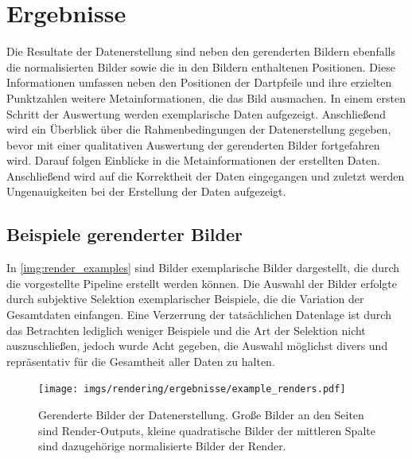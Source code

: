 
\section{Ergebnisse}
\label{sec:daten:ergebnisse}

Die Resultate der Datenerstellung sind neben den gerenderten Bildern ebenfalls die normalisierten Bilder sowie die in den Bildern enthaltenen Positionen. Diese Informationen umfassen neben den Positionen der Dartpfeile und ihre erzielten Punktzahlen weitere Metainformationen, die das Bild ausmachen. In einem ersten Schritt der Auswertung werden exemplarische Daten aufgezeigt. Anschließend wird ein Überblick über die Rahmenbedingungen der Datenerstellung gegeben, bevor mit einer qualitativen Auswertung der gerenderten Bilder fortgefahren wird. Darauf folgen Einblicke in die Metainformationen der erstellten Daten. Anschließend wird auf die Korrektheit der Daten eingegangen und zuletzt werden Ungenauigkeiten bei der Erstellung der Daten aufgezeigt.


\subsection{Beispiele gerenderter Bilder}  %
\label{sec:render_beispiel}

In \autoref{img:render_examples} sind Bilder exemplarische Bilder dargestellt, die durch die vorgestellte Pipeline erstellt werden können. Die Auswahl der Bilder erfolgte durch subjektive Selektion exemplarischer Beispiele, die die Variation der Gesamtdaten einfangen. Eine Verzerrung der tatsächlichen Datenlage ist durch das Betrachten lediglich weniger Beispiele und die Art der Selektion nicht auszuschließen, jedoch wurde Acht gegeben, die Auswahl möglichst divers und repräsentativ für die Gesamtheit aller Daten zu halten.

\begin{figure}
    \centering
    \texttt{[image: imgs/rendering/ergebnisse/example\_renders.pdf]}
    \caption{Gerenderte Bilder der Datenerstellung. Große Bilder an den Seiten sind Render-Outputs, kleine quadratische Bilder der mittleren Spalte sind dazugehörige normalisierte Bilder der Render.}
    \label{img:render_examples}
\end{figure}

